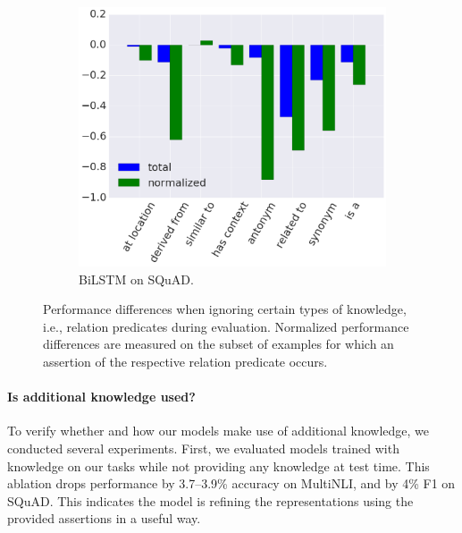 \documentclass[11pt,a4paper]{article}
\begin{document}
\begin{figure}[ht!]
\begin{subfigure}{0.3\textwidth}
\includegraphics[width=\textwidth]{perf_diff_bilstm_squad.png}
\caption{BiLSTM on SQuAD.}
\end{subfigure}
\caption{Performance differences when ignoring certain types of knowledge, i.e., relation predicates during evaluation. Normalized performance differences are measured on the subset of examples for which an assertion of the respective relation predicate occurs.}\label{fig:ignore_relation}
\end{figure}


\paragraph{Is additional knowledge used?} To verify whether and how our models make use of additional knowledge, we conducted several experiments. First, we evaluated models trained with knowledge on our tasks while not providing any knowledge at test time. This ablation drops performance by 3.7--3.9\% accuracy on MultiNLI, and by 4\% F1 on SQuAD. This indicates the model is refining the representations using the provided assertions in a useful way.
\end{document}
